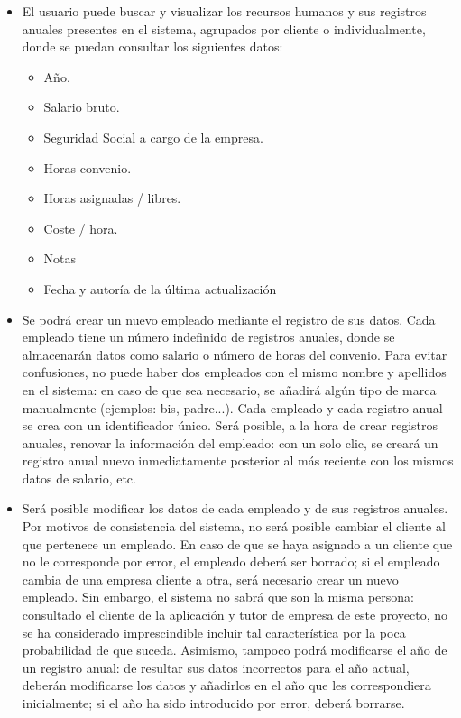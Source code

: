 \begin{itemize}
\item El usuario puede buscar y visualizar los recursos humanos y sus
registros anuales presentes en el sistema, agrupados por cliente o
individualmente, donde se puedan consultar los siguientes datos:
  \begin{itemize}
  \item Año.
  \item Salario bruto.
  \item Seguridad Social a cargo de la empresa.
  \item Horas convenio.
  \item Horas asignadas / libres.
  \item Coste / hora.
  \item Notas
  \item Fecha y autoría de la última actualización
  \end{itemize}

\item Se podrá crear un nuevo empleado mediante el registro de
sus datos. Cada
empleado tiene un número indefinido de registros anuales, donde se almacenarán
datos como salario o número de horas del convenio. Para evitar confusiones, no
puede haber dos empleados con el mismo nombre y apellidos en el sistema: en
caso de que sea necesario, se añadirá algún tipo de marca manualmente
(ejemplos: bis, padre...). Cada empleado y cada registro anual se crea con un
identificador único. Será posible, a la hora de crear registros anuales,
renovar la información del empleado: con un solo clic, se creará un registro
anual nuevo inmediatamente posterior al más reciente con los mismos datos de
salario, etc.

\item Será posible modificar los datos de cada empleado y de sus registros
anuales. Por motivos de consistencia del sistema, no será posible cambiar el
cliente al que pertenece un empleado. En caso de que se haya asignado a un
cliente que no le corresponde por error, el empleado deberá ser borrado; si el
empleado cambia de una empresa cliente a otra, será necesario crear un nuevo
empleado. Sin embargo, el sistema no sabrá que son la misma persona: consultado
el cliente de la aplicación y tutor de empresa de este proyecto, no se ha
considerado imprescindible incluir tal característica por la poca probabilidad
de que suceda. Asimismo, tampoco podrá modificarse el año de un registro anual:
de resultar sus datos incorrectos para el año actual, deberán modificarse los
datos y añadirlos en el año que les correspondiera inicialmente; si el año ha
sido introducido por error, deberá borrarse.


\end{itemize}
